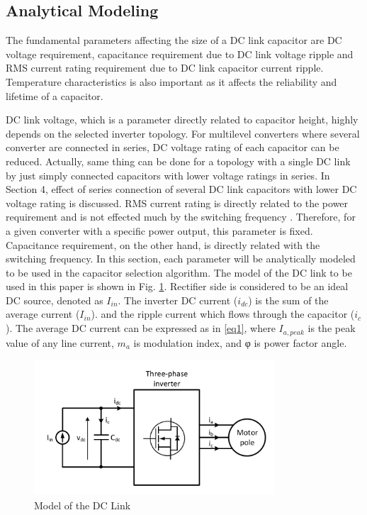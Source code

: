 \documentclass[conference,a4paper,twocolumn]{IEEEtran}
\begin{document}
\subsection{Analytical Modeling}


The fundamental parameters affecting the size of a DC link capacitor are DC voltage requirement, capacitance requirement due to DC link voltage ripple and RMS current rating requirement due to DC link capacitor current ripple. Temperature characteristics is also important as it affects the reliability and lifetime of a capacitor. 

DC link voltage, which is a parameter directly related to capacitor height, highly depends on the selected inverter topology. For multilevel converters where several converter are connected in series, DC voltage rating of each capacitor can be reduced. Actually, same thing can be done for a topology with a single DC link by just simply connected capacitors with lower voltage ratings in series. In Section 4, effect of series connection of several DC link capacitors with lower DC voltage rating is discussed. RMS current rating is directly related to the power requirement and is not effected much by the switching frequency \cite{Wang2013,Wang2015b,Su2010}. Therefore, for a given converter with a specific power output, this parameter is fixed. Capacitance requirement, on the other hand, is directly related with the switching frequency. In this section, each parameter will be analytically modeled to be used in the capacitor selection algorithm. The model of the DC link to be used in this paper is shown in Fig. \ref{fig3}.
Rectifier side is considered to be an ideal DC source, denoted as $I_{in}$. The inverter DC current ($i_{dc}$) is the sum of the average current ($I_{in}$). and the ripple current which flows through the capacitor ($i_c$). The average DC current can be expressed as in \ref{eq1}, where $I_{a,peak}$ is the peak value of any line current, $m_a$ is modulation index, and φ is power factor angle.

\begin{figure}[h]
  \centering
  \includegraphics[width=9cm]{fig3}
  \caption{Model of the DC Link}
  \label{fig3}
\end{figure}
\end{document}
